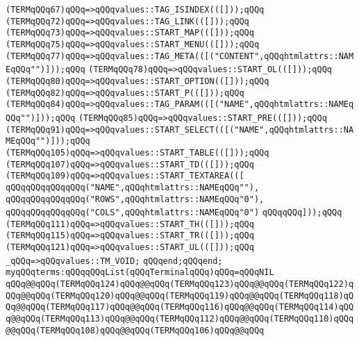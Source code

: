\verb|(TERMqQQq67)qQQq=>qQQqvalues::TAG_ISINDEX(([]));qQQq|\newline
\verb|(TERMqQQq72)qQQq=>qQQqvalues::TAG_LINK(([]));qQQq|\newline
\verb|(TERMqQQq73)qQQq=>qQQqvalues::START_MAP(([]));qQQq|\newline
\verb|(TERMqQQq75)qQQq=>qQQqvalues::START_MENU(([]));qQQq|\newline
\verb|(TERMqQQq77)qQQq=>qQQqvalues::TAG_META(([("CONTENT",qQQqhtmlattrs::NAMEqQQq"")]));qQQq|\newline
\verb|(TERMqQQq78)qQQq=>qQQqvalues::START_OL(([]));qQQq|\newline
\verb|(TERMqQQq80)qQQq=>qQQqvalues::START_OPTION(([]));qQQq|\newline
\verb|(TERMqQQq82)qQQq=>qQQqvalues::START_P(([]));qQQq|\newline
\verb|(TERMqQQq84)qQQq=>qQQqvalues::TAG_PARAM(([("NAME",qQQqhtmlattrs::NAMEqQQq"")]));qQQq|\newline
\verb|(TERMqQQq85)qQQq=>qQQqvalues::START_PRE(([]));qQQq|\newline
\verb|(TERMqQQq91)qQQq=>qQQqvalues::START_SELECT(([("NAME",qQQqhtmlattrs::NAMEqQQq"")]));qQQq|\newline
\verb|(TERMqQQq105)qQQq=>qQQqvalues::START_TABLE(([]));qQQq|\newline
\verb|(TERMqQQq107)qQQq=>qQQqvalues::START_TD(([]));qQQq|\newline
\verb|(TERMqQQq109)qQQq=>qQQqvalues::START_TEXTAREA(([|\newline
\verb|qQQqqQQqqQQqqQQq("NAME",qQQqhtmlattrs::NAMEqQQq""),|\newline
\verb|qQQqqQQqqQQqqQQq("ROWS",qQQqhtmlattrs::NAMEqQQq"0"),|\newline
\verb|qQQqqQQqqQQqqQQq("COLS",qQQqhtmlattrs::NAMEqQQq"0")|\newline
\verb|qQQqqQQq]));qQQq|\newline
\verb|(TERMqQQq111)qQQq=>qQQqvalues::START_TH(([]));qQQq|\newline
\verb|(TERMqQQq115)qQQq=>qQQqvalues::START_TR(([]));qQQq|\newline
\verb|(TERMqQQq121)qQQq=>qQQqvalues::START_UL(([]));qQQq|\newline
\verb|_qQQq=>qQQqvalues::TM_VOID;|\newline
\verb|qQQqend;qQQqend;|\newline
\verb|myqQQqterms:qQQqqQQqList(qQQqTerminalqQQq)qQQq=qQQqNIL|\newline
\verb|qQQq@@qQQq(TERMqQQq124)qQQq@@qQQq(TERMqQQq123)qQQq@@qQQq(TERMqQQq122)qQQq@@qQQq(TERMqQQq120)qQQq@@qQQq(TERMqQQq119)qQQq@@qQQq(TERMqQQq118)qQQq@@qQQq(TERMqQQq117)qQQq@@qQQq(TERMqQQq116)qQQq@@qQQq(TERMqQQq114)qQQq@@qQQq(TERMqQQq113)qQQq@@qQQq(TERMqQQq112)qQQq@@qQQq(TERMqQQq110)qQQq@@qQQq(TERMqQQq108)qQQq@@qQQq(TERMqQQq106)qQQq@@qQQq|\newline
